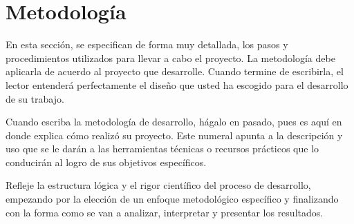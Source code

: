 \chapter{Metodología}

En esta sección, se especifican de forma muy detallada, los pasos y
procedimientos utilizados para llevar a cabo el proyecto.
La metodología debe aplicarla de acuerdo al proyecto que desarrolle.
Cuando termine de escribirla, el lector entenderá perfectamente el diseño que
usted ha escogido para el desarrollo de su trabajo.

Cuando escriba la metodología de desarrollo, hágalo en pasado, pues es aquí
en donde explica cómo realizó su proyecto.
Este numeral apunta a la descripción y uso que se le darán a las herramientas
técnicas o recursos prácticos que lo conducirán al logro de sus objetivos
específicos.

Refleje la estructura lógica y el rigor científico del proceso de desarrollo,
empezando por la elección de un enfoque metodológico específico y
finalizando con la forma como se van a analizar, interpretar y presentar los
resultados.

